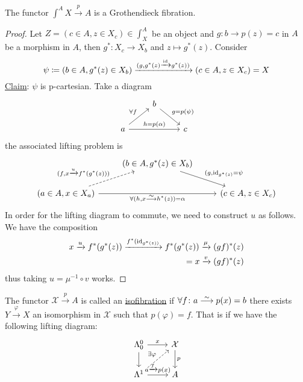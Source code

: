 \begin{prop}
	The functor $ \int^A X \xrightarrow{ p } A $ is a Grothendieck fibration.
\end{prop} 

\begin{proof}
	Let $ Z = ( c \in A , z \in X_c ) \in \int^A_X $ be an object and $g \colon b \to p ( z ) = c $ in $ A $ be a morphism in $ A $, then $ g^* \colon X_c \to X_b $ and $ z \mapsto g^* ( z ) $.
	Consider 
	\[
		\psi \coloneqq ( b \in A , g^* ( z ) \in X_b ) 
		\xrightarrow{(g , g^* ( z ) \xrightarrow{\operatorname{id}} g^* ( z ) )}
		( c \in A , z \in X_c ) = X 
	\]
	\underline{Claim}: $ \psi $ is p-cartesian.
	Take a diagram
	\[
	\begin{tikzcd}
		& 
		b
		\ar[rd, " { g = p ( \psi ) }"]
		\\
		a
		\ar[ru, " \forall f "]
		\ar[rr, " { h = p ( \alpha ) }"]
		&&
		c
	\end{tikzcd}
	\]
	the associated lifting problem is
	\[
	\begin{tikzcd}
		&
		( b \in A , g^* ( z ) \in X_b )
		\ar[rd, "{ ( g , \id_{ g^* ( z ) } = \psi }" ] 	
		\\
		( a \in A , x \in X_a )
		\ar[rr, " {\forall ( h , x \isomorphism h^* ( z ) ) = \alpha } "' ]
		\ar[ru, dashed , " { ( f , x \xrightarrow{ u } f^* ( g^* ( z ) ) ) } "]
		&&
		( c \in A , z \in X_c )
	\end{tikzcd}
	\]
	In order for the lifting diagram to commute, we need to construct $ u $ as follows.
	We have the composition
	\begin{align*}
		x \xrightarrow{u} f^* ( g^* ( z ) ) \xrightarrow{f^* ( \operatorname{id}_{ g^* ( z ) ) } } f^* ( g^* ( z ) ) \xrightarrow{ \mu } ( gf )^* ( z )
		\\
		= x \xrightarrow{v} ( g f )^* ( z )  
	\end{align*}
	thus taking $ u = \mu^{ - 1 } \circ v $ works.
\end{proof}


\begin{defi}
\label{isofibration}
	The functor $ \mathcal{ X } \xrightarrow{p} A $ is called an \underline{isofibration}
	if $ \forall f \colon a \isomorphism p ( x ) = b $ there exists $ Y \xrightarrow{\varphi} X $ an isomorphism in $ \mathcal{ X } $ such that $ p ( \varphi ) = f $.
	That is if we have the following lifting diagram:
	\[
	\begin{tikzcd}
		\Lambda_0^0
		\ar[r, " x "]
		\ar[d]
		& 
		\mathcal{ X }
		\ar[d, " p "]
		\\
		\Lambda^1
		\ar[ru, dashed, " \exists \varphi"]
		\ar[r, " a \xrightarrow{f} p ( x ) "]
		&
		A
	\end{tikzcd}
	\]
\end{defi}

